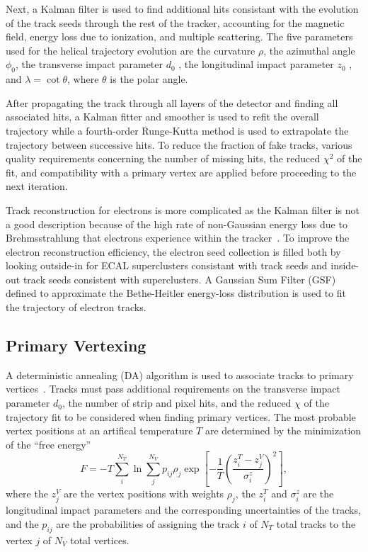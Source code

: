 Next, a Kalman filter is used to find additional hits consistant with the evolution of the track seeds through the rest of the tracker, accounting for the magnetic field, energy loss due to ionization, and multiple scattering.
The five parameters used for the helical trajectory evolution are the curvature $\rho$, the azimuthal angle $\phi_0$, the transverse impact parameter $d_0$ , the longitudinal impact parameter $z_0$ , and $\lambda = \cot \theta$, where $\theta$ is the polar angle.

After propagating the track through all layers of the detector and finding all associated hits, a Kalman fitter and smoother is used to refit the overall trajectory while a fourth-order Runge-Kutta method is used to extrapolate the trajectory between successive hits.
To reduce the fraction of fake tracks, various quality requirements concerning the number of missing hits, the reduced $\chi^2$ of the fit, and compatibility with a primary vertex are applied before proceeding to the next iteration.

Track reconstruction for electrons is more complicated as the Kalman filter is not a good description because of the high rate of non-Gaussian energy loss due to Brehmsstrahlung that electrons experience within the tracker~\cite{PF2017}.
To improve the electron reconstruction efficiency, the electron seed collection is filled both by looking outside-in for ECAL superclusters consistant with track seeds and inside-out track seeds consistent with superclusters.
A Gaussian Sum Filter (GSF) defined to approximate the Bethe-Heitler energy-loss distribution is used to fit the trajectory of electron tracks. 

\subsection{Primary Vertexing}
\label{sec:pf_pv}

A deterministic annealing (DA) algorithm is used to associate tracks to primary vertices~\cite{Tracker2014}.
Tracks must pass additional requirements on the transverse impact parameter $d_0$, the number of strip and pixel hits, and the reduced $\chi$ of the trajectory fit to be considered when finding primary vertices.
The most probable vertex positions at an artifical temperature $T$ are determined by the minimization of the ``free energy''
\begin{equation}
  F = -T \sum_i^{N_T} \ln \sum_j^{N_V} p_{ij} \rho_j \exp \left[ - \frac{1}{T} \left(\frac{z_i^T - z_j^V}{\sigma^z_i}\right)^2 \right],
\end{equation}
where the $z_j^V$ are the vertex positions with weights $\rho_j$, the $z_i^T$ and $\sigma_i^z$  are the longitudinal impact parameters and the corresponding uncertainties of the tracks, and the $p_{ij}$ are the probabilities of assigning the track $i$ of $N_T$ total tracks to the vertex $j$ of $N_V$ total vertices.

